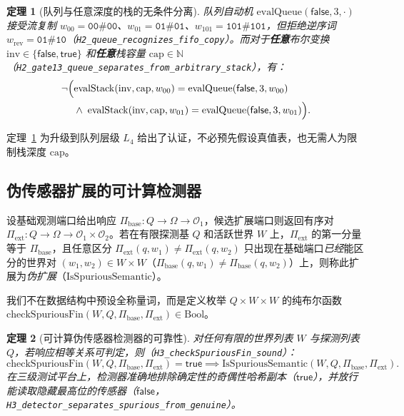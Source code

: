 \documentclass[11pt,a4paper]{article}
\theoremstyle{cleanthm}
\newtheorem{theorem}{定理}[section]
\theoremstyle{cleandef}
\begin{document}
\begin{theorem}[队列与任意深度的栈的无条件分离]
\label{thm:h2_queue_vs_stack}
队列自动机 $\mathrm{evalQueue}(\mathsf{false},3,\cdot)$ 接受流复制 $w_{00}=\mathtt{00\#00}$、$w_{01}=\mathtt{01\#01}$、$w_{101}=\mathtt{101\#101}$，但拒绝逆序词 $w_{\mathrm{rev}}=\mathtt{01\#10}$（\texttt{H2\_queue\_\allowbreak recognizes\_\allowbreak fifo\_\allowbreak copy}）。而对于\textbf{任意}布尔变换 $\mathrm{inv}\in\{\mathsf{false},\mathsf{true}\}$ 和\textbf{任意}栈容量 $\mathrm{cap}\in\mathbb{N}$（\texttt{H2\_gate13\_\allowbreak queue\_\allowbreak separates\_\allowbreak from\_\allowbreak arbitrary\_\allowbreak stack}），有：
\begin{equation}
  \neg\begin{aligned}[t]
    \Bigl(&\mathrm{evalStack}(\mathrm{inv},\mathrm{cap},w_{00}) = \mathrm{evalQueue}(\mathsf{false},3,w_{00}) \\
          &\land\; \mathrm{evalStack}(\mathrm{inv},\mathrm{cap},w_{01}) = \mathrm{evalQueue}(\mathsf{false},3,w_{01})\Bigr).
  \end{aligned}
\end{equation}
\end{theorem}

定理~\ref{thm:h2_queue_vs_stack} 为升级到队列层级 $L_4$ 给出了认证，不必预先假设真值表，也无需人为限制栈深度 $\mathrm{cap}$。

\subsection{伪传感器扩展的可计算检测器}

设基础观测端口给出响应 $\Pi_{\mathrm{base}}:Q\to\Omega\to\mathcal{O}_1$，候选扩展端口则返回有序对 $\Pi_{\mathrm{ext}}:Q\to\Omega\to\mathcal{O}_1\times\mathcal{O}_2$。若在有限探测基 $Q$ 和活跃世界 $W$ 上，$\Pi_{\mathrm{ext}}$ 的第一分量等于 $\Pi_{\mathrm{base}}$，且任意区分 $\Pi_{\mathrm{ext}}(q,w_1)\ne\Pi_{\mathrm{ext}}(q,w_2)$ 只出现在基础端口\emph{已经}能区分的世界对 $(w_1,w_2)\in W\times W$（$\Pi_{\mathrm{base}}(q,w_1)\ne\Pi_{\mathrm{base}}(q,w_2)$）上，则称此扩展为\emph{伪扩展}（$\mathrm{IsSpuriousSemantic}$）。

我们不在数据结构中预设全称量词，而是定义枚举 $Q\times W\times W$ 的纯布尔函数 $\mathrm{checkSpuriousFin}(W,Q,\Pi_{\mathrm{base}},\Pi_{\mathrm{ext}})\in\mathrm{Bool}$。

\begin{theorem}[可计算伪传感器检测器的可靠性]
\label{thm:h3_spurious}
对任何有限的世界列表 $W$ 与探测列表 $Q$，若响应相等关系可判定，则（\texttt{H3\_checkSpuriousFin\_sound}）：
\begin{equation}
  \mathrm{checkSpuriousFin}(W,Q,\Pi_{\mathrm{base}},\Pi_{\mathrm{ext}}) = \mathsf{true} \implies \mathrm{IsSpuriousSemantic}(W,Q,\Pi_{\mathrm{base}},\Pi_{\mathrm{ext}}).
\end{equation}
在三级测试平台上，检测器准确地排除确定性的奇偶性哈希副本（$\mathsf{true}$），并放行能读取隐藏最高位的传感器（$\mathsf{false}$，\texttt{H3\_detector\_\allowbreak separates\_\allowbreak spurious\_\allowbreak from\_\allowbreak genuine}）。
\end{theorem}
\end{document}
